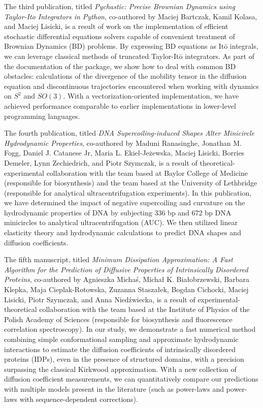 \documentclass{doctoral}
\newcommand{\code}[1]{\texttt{\detokenize{#1}}}
\begin{document}
The third publication, titled \emph{Pychastic: Precise Brownian Dynamics using Taylor-Ito Integrators in Python}, co-authored by Maciej Bartczak, Kamil Kolasa, and Maciej Lisicki, is a result of work on the implementation of efficient stochastic differential equations solvers capable of convenient treatment of Brownian Dynamics (BD) problems.
By expressing BD equations as Itō integrals, we can leverage classical methods of truncated Taylor-Itō integrators.
As part of the documentation of the \code{pychastic} package, we show how to deal with common BD obstacles: calculations of the divergence of the mobility tensor in the diffusion equation and discontinuous trajectories encountered when working with dynamics on $S^2$ and $SO(3)$.
With a vectorization-oriented implementation, we have achieved performance comparable to earlier implementations in lower-level programming languages.

The fourth publication, titled \emph{DNA Supercoiling-induced Shapes Alter Minicircle Hydrodynamic Properties}, co-authored by Maduni Ranasinghe, Jonathan M.
Fogg, Daniel J.
Catanese Jr, Maria L.
Ekiel-Jeżewska, Maciej Lisicki, Borries Demeler, Lynn Zechiedrich, and Piotr Szymczak, is a result of theoretical-experimental collaboration with the team based at Baylor College of Medicine (responsible for biosynthesis) and the team based at the University of Lethbridge (responsible for analytical ultracentrifugation experiments).
In this publication, we have determined the impact of negative supercoiling and curvature on the hydrodynamic properties of DNA by subjecting 336 bp and 672 bp DNA minicircles to analytical ultracentrifugation (AUC).
We then utilized linear elasticity theory and hydrodynamic calculations to predict DNA shapes and diffusion coefficients.

The fifth manuscript, titled \emph{Minimum Dissipation Approximation: A Fast Algorithm for the Prediction of Diffusive Properties of Intrinsically Disordered Proteins}, co-authored by Agnieszka Michaś, Michał K.
Białobrzewski, Barbara Klepka, Maja Cieplak-Rotowska, Zuzanna Staszałek, Bogdan Cichocki, Maciej Lisicki, Piotr Szymczak, and Anna Niedźwiecka, is a result of experimental-theoretical collaboration with the team based at the Institute of Physics of the Polish Academy of Sciences (responsible for biosynthesis and fluorescence correlation spectroscopy).
In our study, we demonstrate a fast numerical method combining simple conformational sampling and approximate hydrodynamic interactions to estimate the diffusion coefficients of intrinsically disordered proteins (IDPs), even in the presence of structured domains, with a precision surpassing the classical Kirkwood approximation.
With a new collection of diffusion coefficient measurements, we can quantitatively compare our predictions with multiple models present in the literature (such as power-laws and power-laws with sequence-dependent corrections).
\end{document}
